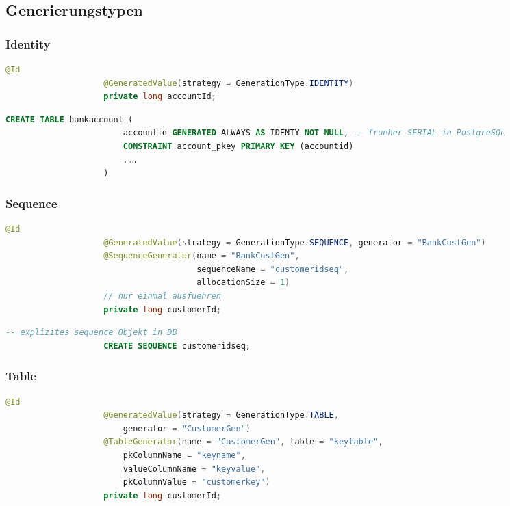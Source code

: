 \documentclass[a4paper, landscape, 8pt]{scrartcl}
\begin{document}
\begin{multicols*}{4}
        \subsection{Generierungstypen}
        \subsubsection{Identity}
        \begin{lstlisting}[language=java]
                    @Id
                    @GeneratedValue(strategy = GenerationType.IDENTITY)
                    private long accountId;
        \end{lstlisting}
        \begin{lstlisting}[language=sql]
                    CREATE TABLE bankaccount (
                        accountid GENERATED ALWAYS AS IDENTY NOT NULL, -- frueher SERIAL in PostgreSQL
                        CONSTRAINT account_pkey PRIMARY KEY (accountid)
                        ...
                    )
        \end{lstlisting}

        \subsubsection{Sequence}
        \begin{lstlisting}[language=java]
                    @Id
                    @GeneratedValue(strategy = GenerationType.SEQUENCE, generator = "BankCustGen")
                    @SequenceGenerator(name = "BankCustGen",
                                       sequenceName = "customeridseq",
                                       allocationSize = 1)
                    // nur einmal ausfuehren
                    private long customerId;
        \end{lstlisting}
        \begin{lstlisting}[language=sql]
                    -- explizites sequence Objekt in DB
                    CREATE SEQUENCE customeridseq;
        \end{lstlisting}

        \subsubsection{Table}
        \begin{lstlisting}[language=java]
                    @Id
                    @GeneratedValue(strategy = GenerationType.TABLE,
                        generator = "CustomerGen")
                    @TableGenerator(name = "CustomerGen", table = "keytable",
                        pkColumnName = "keyname",
                        valueColumnName = "keyvalue",
                        pkColumnValue = "customerkey")
                    private long customerId;
        \end{lstlisting}


\end{multicols*}
\end{document}
